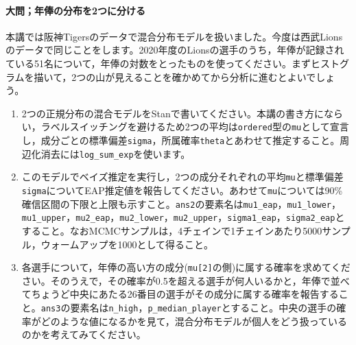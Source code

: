 \documentclass{ltjsbook}
\begin{document}
\paragraph{大問；年俸の分布を2つに分ける}
本講では阪神Tigersのデータで混合分布モデルを扱いました。今度は西武Lionsのデータで同じことをします。2020年度のLionsの選手のうち，年俸が記録されている51名について，年俸の対数をとったものを使ってください。まずヒストグラムを描いて，2つの山が見えることを確かめてから分析に進むとよいでしょう。
\begin{enumerate}
	\item 2つの正規分布の混合モデルをStanで書いてください。本講の書き方にならい，ラベルスイッチングを避けるため2つの平均は\verb|ordered|型の\verb|mu|として宣言し，成分ごとの標準偏差\verb|sigma|，所属確率\verb|theta|とあわせて推定すること。周辺化消去には\verb|log_sum_exp|を使います。
	\item このモデルでベイズ推定を実行し，2つの成分それぞれの平均\verb|mu|と標準偏差\verb|sigma|についてEAP推定値を報告してください。あわせて\verb|mu|については90\%確信区間の下限と上限も示すこと。\verb|ans2|の要素名は\verb|mu1_eap|，\verb|mu1_lower|，\verb|mu1_upper|，\verb|mu2_eap|，\verb|mu2_lower|，\verb|mu2_upper|，\verb|sigma1_eap|，\verb|sigma2_eap|とすること。なおMCMCサンプルは，4チェインで1チェインあたり5000サンプル，ウォームアップを1000として得ること。
	\item 各選手について，年俸の高い方の成分(\verb|mu[2]|の側)に属する確率を求めてください。そのうえで，その確率が0.5を超える選手が何人いるかと，年俸で並べてちょうど中央にあたる26番目の選手がその成分に属する確率を報告すること。\verb|ans3|の要素名は\verb|n_high|，\verb|p_median_player|とすること。中央の選手の確率がどのような値になるかを見て，混合分布モデルが個人をどう扱っているのかを考えてみてください。
\end{enumerate}
\end{document}
